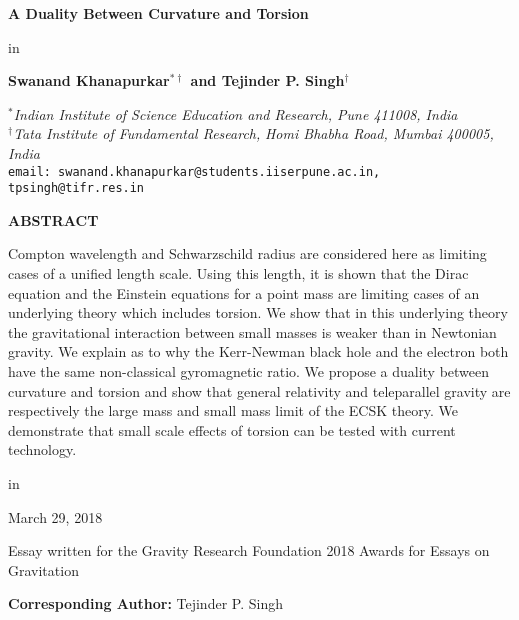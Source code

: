\documentclass[prd, preprint, 12pt]{revtex4-1}
\begin{document}
 

\begin{center}
 { \large {\bf A Duality Between Curvature and Torsion }}





 in


{\large{\bf Swanand Khanapurkar$^{*\dagger}$ and Tejinder P.  Singh$^\dagger$}}

\medskip
{\it $^{*}$Indian Institute of Science Education and Research, Pune 411008, India }\\  
{\it $^\dagger$Tata Institute of Fundamental Research,}
{\it Homi Bhabha Road, Mumbai 400005, India}\\
\bigskip
{\tt email:  swanand.khanapurkar@students.iiserpune.ac.in, tpsingh@tifr.res.in}\\

\end{center}

\bigskip
\bigskip

\centerline{\bf ABSTRACT}
\noindent Compton wavelength and Schwarzschild radius are considered here  as limiting cases of a unified length scale. Using this length, it is shown that the Dirac equation and the Einstein equations for a point mass are limiting cases of an underlying theory which includes torsion. We show that in this underlying theory the gravitational interaction between small masses is weaker than in Newtonian gravity. We explain as to why the Kerr-Newman black hole and the electron both have the same non-classical gyromagnetic ratio.  We propose a duality between curvature and torsion and show that general relativity and teleparallel gravity are respectively the large mass and small mass limit of the ECSK theory. We demonstrate that small scale effects of torsion can be tested with current technology.

\bigskip
\noindent 
\noindent 

 in

\centerline{March 29, 2018}

\bigskip

\centerline{Essay written for the Gravity Research Foundation 2018 Awards for Essays on Gravitation}
\bigskip

\centerline {{\bf Corresponding Author:} Tejinder P. Singh}
\bigskip
\end{document}
